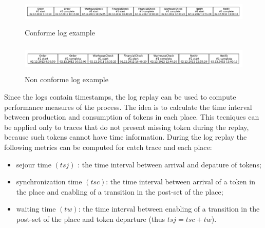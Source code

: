 \documentclass[11pt]{article}
\begin{document}
\begin{figure}[t]\label{ConfLog}
\centering
\includegraphics[width=400pt,height=40pt]
{./items/logConforme.pdf}
\caption{Conforme log example}
\end{figure}

\begin{figure}[h]\label{NonConfLog}
\centering
\includegraphics[width=400pt,height=40pt]
{./items/logNonConforme.pdf}
\caption{Non conforme log example}
\end{figure}

Since the logs contain timestamps, the log replay can be used to compute performance measures of the process. The idea is to calculate the time interval between production and consumption of tokens in each place. This tecniques can be applied only to traces that do not present missing token during the replay, because such tokens cannot have time information. During the log replay the following metrics can be computed for catch trace and each place:
\begin{itemize}
\item sejour time $(tsj)$ : the time interval between arrival and depature of tokens;
\item synchronization time $(tsc)$: the time interval between arrival of a token in the place and enabling of a transition in the post-set of the place;
\item waiting time $(tw)$:  the time interval between enabling of a transition in the post-set of the place and token departure (thus $tsj=tsc+tw $).
\end{itemize}
\end{document}
